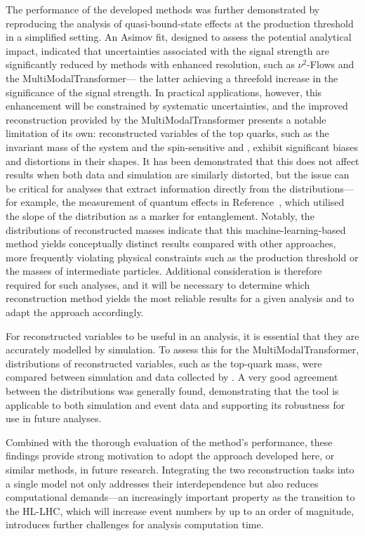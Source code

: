 The performance of the developed methods was further demonstrated by reproducing the analysis of quasi-bound-state effects at the production threshold in a simplified setting. An Asimov fit, designed to assess the potential analytical impact, indicated that uncertainties associated with the signal strength are significantly reduced by methods with enhanced resolution, such as $\nu^2$-Flows and the MultiModalTransformer— the latter achieving a threefold increase in the significance of the signal strength. In practical applications, however, this enhancement will be constrained by systematic uncertainties, and the improved reconstruction provided by the MultiModalTransformer presents a notable limitation of its own: reconstructed variables of the top quarks, such as the invariant mass of the \ttbar system and the spin-sensitive \chel and \chan, exhibit significant biases and distortions in their shapes. It has been demonstrated that this does not affect results when both data and simulation are similarly distorted, but the issue can be critical for analyses that extract information directly from the distributions— for example, the measurement of quantum effects in Reference~\cite{atlas_entanglement}, which utilised the slope of the \chel distribution as a marker for entanglement. Notably, the distributions of reconstructed masses indicate that this machine-learning-based method yields conceptually distinct results compared with other approaches, more frequently violating physical constraints such as the production threshold or the masses of intermediate particles. Additional consideration is therefore required for such analyses, and it will be necessary to determine which reconstruction method yields the most reliable results for a given analysis and to adapt the approach accordingly.

For reconstructed variables to be useful in an analysis, it is essential that they are accurately modelled by simulation. To assess this for the MultiModalTransformer, distributions of reconstructed variables, such as the top-quark mass, were compared between simulation and data collected by \atlas. A very good agreement between the distributions was generally found, demonstrating that the tool is applicable to both simulation and event data and supporting its robustness for use in future analyses.

Combined with the thorough evaluation of the method's performance, these findings provide strong motivation to adopt the approach developed here, or similar methods, in future research. Integrating the two reconstruction tasks into a single model not only addresses their interdependence but also reduces computational demands—an increasingly important property as the transition to the HL-LHC, which will increase event numbers by up to an order of magnitude, introduces further challenges for analysis computation time.

